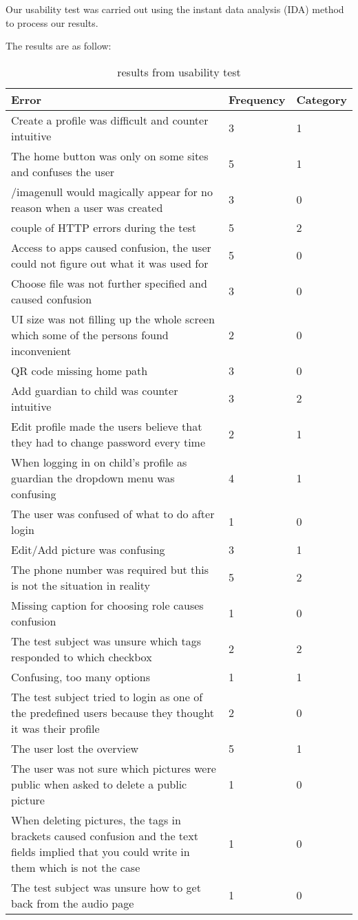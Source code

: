 Our usability test was carried out using the instant data analysis (IDA) method to process our results.

The results are as follow:

\begin{table}
	\centering
	\begin{tabular}{|p{7cm}|l|l|}
		\hline
		Error & Frequency & Category \\
		\hline
		\hline
		Create a profile was difficult and counter intuitive & 3 & 1 \\ \hline
		The home button was only on some sites and confuses the user & 5 & 1 \\ \hline
		/imagenull would magically appear for no reason when a user was created & 3 & 0 \\ \hline
		couple of HTTP errors during the test & 5 & 2 \\ \hline
		Access to apps caused confusion, the user could not figure out what it was used for & 5 & 0 \\ \hline
		Choose file was not further specified and caused confusion & 3 & 0 \\ \hline
		UI size was not filling up the whole screen which some of the persons found inconvenient & 2 & 0 \\ \hline
		QR code missing home path & 3 & 0 \\ \hline
		Add guardian to child was  counter intuitive & 3 & 2 \\ \hline
		Edit profile made the users believe that they had to change password every time & 2 & 1 \\ \hline
		When logging in on child's profile as guardian the dropdown menu was confusing & 4 & 1 \\ \hline
		The user was confused of what to do after login & 1 & 0 \\ \hline
		Edit/Add picture was confusing & 3 & 1 \\ \hline
		The phone number was required but this is not the situation in reality & 5 & 2 \\ \hline
		Missing caption for choosing role causes confusion & 1 & 0 \\ \hline
		The test subject was unsure which tags responded to which checkbox & 2 & 2 \\ \hline
		Confusing, too many options & 1 & 1 \\ \hline
		The test subject tried to login as one of the predefined users because they thought it was their profile & 2 & 0 \\ \hline
		The user lost the overview & 5 & 1 \\ \hline
		The user was not sure which pictures were public when asked to delete a public picture & 1 & 0 \\ \hline
		When deleting pictures, the tags in brackets caused confusion and the text fields implied that you could write in them which is not the case & 1 & 0 \\ \hline
		The test subject was unsure how to get back from the audio page & 1 & 0 \\
		\hline
	\end{tabular}
	\caption{results from usability test}
	\label{tab:results}
\end{table}

